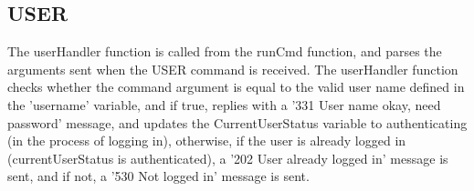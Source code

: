\documentclass[11pt,a4paper,titlepage]{article}
\begin{document}
\subsection{USER}
The userHandler function is called from the runCmd function, and parses the arguments sent when the USER command is received. The userHandler function checks whether the command argument is equal to the valid user name defined in the 'username' variable, and if true, replies with a '331 User name okay, need password' message, and updates the CurrentUserStatus variable to authenticating (in the process of logging in), otherwise, if the user is already logged in (currentUserStatus is authenticated), a '202 User already logged in' message is sent, and if not, a '530 Not logged in' message is sent.

\nocite{*}

\clearpage

\raggedright

\end{document}
